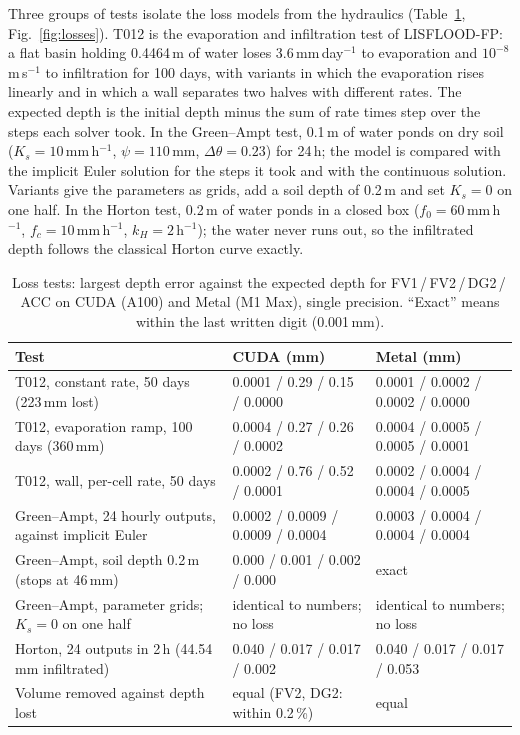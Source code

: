 \documentclass[draft,linenumbers]{agujournal2025}
\begin{document}
Three groups of tests isolate the loss models from the hydraulics
(Table~\ref{tab:losses}, Fig.~\ref{fig:losses}). T012 is the evaporation and
infiltration test of LISFLOOD-FP: a flat basin holding 0.4464\,m of water
loses 3.6\,mm\,day$^{-1}$ to evaporation and $10^{-8}$\,m\,s$^{-1}$ to
infiltration for 100 days, with variants in which the evaporation rises
linearly and in which a wall separates two halves with different rates. The
expected depth is the initial depth minus the sum of rate times step over
the steps each solver took. In the Green--Ampt test, 0.1\,m of water ponds
on dry soil ($K_s = 10$\,mm\,h$^{-1}$, $\psi = 110$\,mm, $\Delta\theta =
0.23$) for 24\,h; the model is compared with the implicit Euler solution for
the steps it took and with the continuous solution. Variants give the
parameters as grids, add a soil depth of 0.2\,m and set $K_s = 0$ on one
half. In the Horton test, 0.2\,m of water ponds in a closed box ($f_0 =
60$\,mm\,h$^{-1}$, $f_c = 10$\,mm\,h$^{-1}$, $k_H = 2$\,h$^{-1}$); the water
never runs out, so the infiltrated depth follows the classical Horton curve
exactly.

\begin{table}[t]
\caption{Loss tests: largest depth error against the expected depth for
FV1\,/\,FV2\,/\,DG2\,/\,ACC on CUDA (A100) and Metal (M1 Max), single
precision. ``Exact'' means within the last written digit (0.001\,mm).}
\label{tab:losses}
\centering\small
\begin{tabularx}{\textwidth}{@{}X ll@{}}
\toprule
Test & CUDA (mm) & Metal (mm) \\
\midrule
T012, constant rate, 50 days (223\,mm lost) & 0.0001 / 0.29 / 0.15 / 0.0000 & 0.0001 / 0.0002 / 0.0002 / 0.0000 \\
T012, evaporation ramp, 100 days (360\,mm) & 0.0004 / 0.27 / 0.26 / 0.0002 & 0.0004 / 0.0005 / 0.0005 / 0.0001 \\
T012, wall, per-cell rate, 50 days & 0.0002 / 0.76 / 0.52 / 0.0001 & 0.0002 / 0.0004 / 0.0004 / 0.0005 \\
Green--Ampt, 24 hourly outputs, against implicit Euler & 0.0002 / 0.0009 / 0.0009 / 0.0004 & 0.0003 / 0.0004 / 0.0004 / 0.0004 \\
Green--Ampt, soil depth 0.2\,m (stops at 46\,mm) & 0.000 / 0.001 / 0.002 / 0.000 & exact \\
Green--Ampt, parameter grids; $K_s = 0$ on one half & identical to numbers; no loss & identical to numbers; no loss \\
Horton, 24 outputs in 2\,h (44.54\,mm infiltrated) & 0.040 / 0.017 / 0.017 / 0.002 & 0.040 / 0.017 / 0.017 / 0.053 \\
Volume removed against depth lost & equal (FV2, DG2: within 0.2\,\%) & equal \\
\bottomrule
\end{tabularx}
\end{table}
\end{document}
